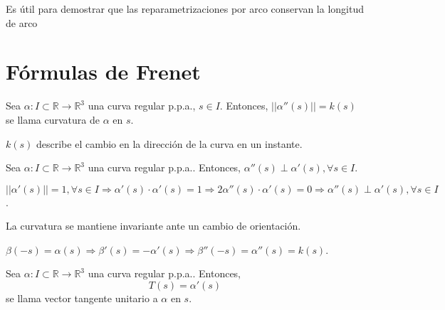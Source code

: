\begin{obs}
  Es útil para demostrar que las reparametrizaciones por arco conservan la longitud de arco
\end{obs}

\section{Fórmulas de Frenet}

\begin{defn}[Curvatura]
  Sea $\alpha : I \subset \mathbb{R} \to \mathbb{R}^{3}$ una curva regular p.p.a., $s \in I$. Entonces, $||\alpha''(s)|| = k(s)$ se llama curvatura de $\alpha$ en $s$.
\end{defn}
 
\begin{obs}
  $k(s)$ describe el cambio en la dirección de la curva en un instante.
\end{obs}


\begin{prop}
  Sea $\alpha  : I \subset \mathbb{R} \to \mathbb{R}^{3}$ una curva regular p.p.a.. Entonces, $\alpha''(s) \perp \alpha'(s), \forall s \in I$.
\end{prop}

\begin{dem}
  $||\alpha'(s)|| = 1, \forall s \in I \Rightarrow \alpha'(s) \cdot \alpha'(s) = 1 \Rightarrow 2 \alpha''(s) \cdot \alpha'(s) = 0 \Rightarrow \alpha''(s) \perp \alpha'(s), \forall s \in I$.
\end{dem}

\begin{prop}
  La curvatura se mantiene invariante ante un cambio de orientación. 
\end{prop}

\begin{dem}
  $\beta(-s) = \alpha(s) \Rightarrow \beta'(s) = -\alpha'(s) \Rightarrow \beta''(-s) = \alpha''(s) = k(s)$. 
\end{dem}

\begin{defn}
  Sea $\alpha  : I \subset \mathbb{R} \to \mathbb{R}^{3}$ una curva regular p.p.a.. Entonces,
  \[
    T(s) = \alpha'(s) \]
  se llama vector tangente unitario a $\alpha$ en $s$.
\end{defn}

